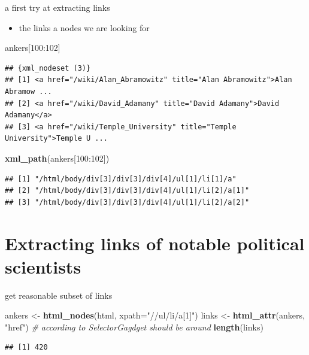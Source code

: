\documentclass[ignorenonframetext,]{beamer}
\newenvironment{Shaded}{\begin{snugshade}}{\end{snugshade}}
\newcommand{\KeywordTok}[1]{\textcolor[rgb]{0.13,0.29,0.53}{\textbf{{#1}}}}
\newcommand{\DataTypeTok}[1]{\textcolor[rgb]{0.13,0.29,0.53}{{#1}}}
\newcommand{\DecValTok}[1]{\textcolor[rgb]{0.00,0.00,0.81}{{#1}}}
\newcommand{\StringTok}[1]{\textcolor[rgb]{0.31,0.60,0.02}{{#1}}}
\newcommand{\CommentTok}[1]{\textcolor[rgb]{0.56,0.35,0.01}{\textit{{#1}}}}
\newcommand{\NormalTok}[1]{{#1}}
\providecommand{\tightlist}{%
  \setlength{\itemsep}{0pt}\setlength{\parskip}{0pt}}
\begin{document}
\begin{frame}[fragile]{a first try at extracting links}

\begin{itemize}
\tightlist
\item
  the links a nodes we are looking for
\end{itemize}

\begin{Shaded}
\begin{Highlighting}[]
\NormalTok{ankers[}\DecValTok{100}\NormalTok{:}\DecValTok{102}\NormalTok{]}
\end{Highlighting}
\end{Shaded}

\begin{verbatim}
## {xml_nodeset (3)}
## [1] <a href="/wiki/Alan_Abramowitz" title="Alan Abramowitz">Alan Abramow ...
## [2] <a href="/wiki/David_Adamany" title="David Adamany">David Adamany</a>
## [3] <a href="/wiki/Temple_University" title="Temple University">Temple U ...
\end{verbatim}

\begin{Shaded}
\begin{Highlighting}[]
\KeywordTok{xml_path}\NormalTok{(ankers[}\DecValTok{100}\NormalTok{:}\DecValTok{102}\NormalTok{])}
\end{Highlighting}
\end{Shaded}

\begin{verbatim}
## [1] "/html/body/div[3]/div[3]/div[4]/ul[1]/li[1]/a"   
## [2] "/html/body/div[3]/div[3]/div[4]/ul[1]/li[2]/a[1]"
## [3] "/html/body/div[3]/div[3]/div[4]/ul[1]/li[2]/a[2]"
\end{verbatim}

\end{frame}

\section{Extracting links of notable political
scientists}\label{extracting-links-of-notable-political-scientists}

\begin{frame}[fragile]{get reasonable subset of links}

\begin{Shaded}
\begin{Highlighting}[]
\NormalTok{ankers <-}\StringTok{ }\KeywordTok{html_nodes}\NormalTok{(html, }\DataTypeTok{xpath=}\StringTok{"//ul/li/a[1]"}\NormalTok{)}
\NormalTok{links  <-}\StringTok{ }\KeywordTok{html_attr}\NormalTok{(ankers, }\StringTok{"href"}\NormalTok{)}
\CommentTok{# according to SelectorGagdget should be around}
\KeywordTok{length}\NormalTok{(links) }
\end{Highlighting}
\end{Shaded}

\begin{verbatim}
## [1] 420
\end{verbatim}

\end{frame}
\end{document}
